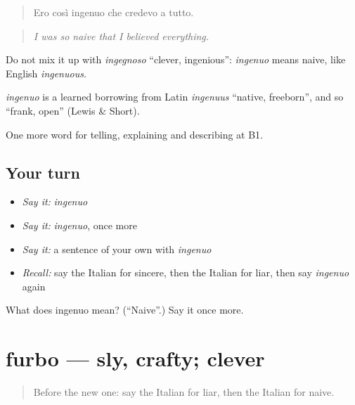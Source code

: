 \begin{quote}
Ero così ingenuo che credevo a tutto.
\end{quote}

\begin{quote}
\emph{I was so naive that I believed everything.}
\end{quote}

Do not mix it up with \emph{ingegnoso} \textquotedblleft{}clever, ingenious\textquotedblright{}: \emph{ingenuo} means naive, like English \emph{ingenuous}.

\begin{cousinweb}
\emph{ingenuo} is a learned borrowing from Latin \emph{ingenuus} \textquotedblleft{}native, freeborn\textquotedblright{}, and so \textquotedblleft{}frank, open\textquotedblright{} (Lewis \& Short).
\end{cousinweb}

\begin{grammarlens}[title={What you've built}]
One more word for telling, explaining and describing at B1.
\end{grammarlens}

\subsection*{Your turn}
\begin{itemize}
\raggedright
  \item \emph{Say it:} \emph{ingenuo}
  \item \emph{Say it:} \emph{ingenuo}, once more
  \item \emph{Say it:} a sentence of your own with \emph{ingenuo}
  \item \emph{Recall:} say the Italian for sincere, then the Italian for liar, then say \emph{ingenuo} again
\end{itemize}

\begin{tcolorbox}[breakable,colback=teal!4,colframe=teal!35!black,title={Before you move on}]
What does ingenuo mean? (\textquotedblleft{}Naive\textquotedblright{}.) Say it once more.
\end{tcolorbox}
\section[furbo]{furbo — sly, crafty; clever}

\label{lesson:IT-C473-furbo}



\begin{quote}
Before the new one: say the Italian for liar, then the Italian for naive.
\end{quote}

